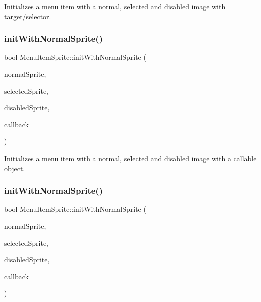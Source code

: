 Initializes a menu item with a normal, selected and disabled image with target/selector. \mbox{\label{classMenuItemSprite_a2cbb85645b77b5e6a356212dea870ad2}} 
\subsubsection{\texorpdfstring{init\+With\+Normal\+Sprite()}{initWithNormalSprite()}\hspace{0.1cm}{\footnotesize\ttfamily [3/4]}}
{\footnotesize\ttfamily bool Menu\+Item\+Sprite\+::init\+With\+Normal\+Sprite (\begin{DoxyParamCaption}\item[{\hyperlink{classNode}{Node} $\ast$}]{normal\+Sprite,  }\item[{\hyperlink{classNode}{Node} $\ast$}]{selected\+Sprite,  }\item[{\hyperlink{classNode}{Node} $\ast$}]{disabled\+Sprite,  }\item[{const cc\+Menu\+Callback \&}]{callback }\end{DoxyParamCaption})}

Initializes a menu item with a normal, selected and disabled image with a callable object. \mbox{\label{classMenuItemSprite_a2cbb85645b77b5e6a356212dea870ad2}} 
\subsubsection{\texorpdfstring{init\+With\+Normal\+Sprite()}{initWithNormalSprite()}\hspace{0.1cm}{\footnotesize\ttfamily [4/4]}}
{\footnotesize\ttfamily bool Menu\+Item\+Sprite\+::init\+With\+Normal\+Sprite (\begin{DoxyParamCaption}\item[{\hyperlink{classNode}{Node} $\ast$}]{normal\+Sprite,  }\item[{\hyperlink{classNode}{Node} $\ast$}]{selected\+Sprite,  }\item[{\hyperlink{classNode}{Node} $\ast$}]{disabled\+Sprite,  }\item[{const cc\+Menu\+Callback \&}]{callback }\end{DoxyParamCaption})}

